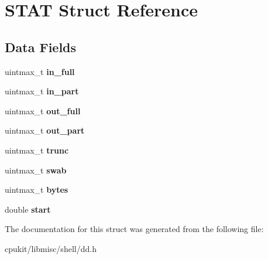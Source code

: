 \hypertarget{structSTAT}{}\section{S\+T\+AT Struct Reference}
\label{structSTAT}
\subsection*{Data Fields}
\begin{DoxyCompactItemize}
\item 
\mbox{\label{structSTAT_a85422399c5eeb7bfdd14c8fc3e3030da}} 
uintmax\+\_\+t {\bfseries in\+\_\+full}
\item 
\mbox{\label{structSTAT_ac2e5b7935ee8c33380d778b16e4cef86}} 
uintmax\+\_\+t {\bfseries in\+\_\+part}
\item 
\mbox{\label{structSTAT_a0b1d02adc06e6d32294b75a5d841e02c}} 
uintmax\+\_\+t {\bfseries out\+\_\+full}
\item 
\mbox{\label{structSTAT_a2f6e20d873ed6457db055568b7c81f4d}} 
uintmax\+\_\+t {\bfseries out\+\_\+part}
\item 
\mbox{\label{structSTAT_af6ec4bcb959c3d38d54aca9252ec7639}} 
uintmax\+\_\+t {\bfseries trunc}
\item 
\mbox{\label{structSTAT_a1e9744f86ae5fc2c915f8e5fc34474e9}} 
uintmax\+\_\+t {\bfseries swab}
\item 
\mbox{\label{structSTAT_adda32a29ea22349a630ba3d553b95f6c}} 
uintmax\+\_\+t {\bfseries bytes}
\item 
\mbox{\label{structSTAT_a402a1ed39179c3d38309eec63e758540}} 
double {\bfseries start}
\end{DoxyCompactItemize}


The documentation for this struct was generated from the following file\+:\begin{DoxyCompactItemize}
\item 
cpukit/libmisc/shell/dd.\+h\end{DoxyCompactItemize}
